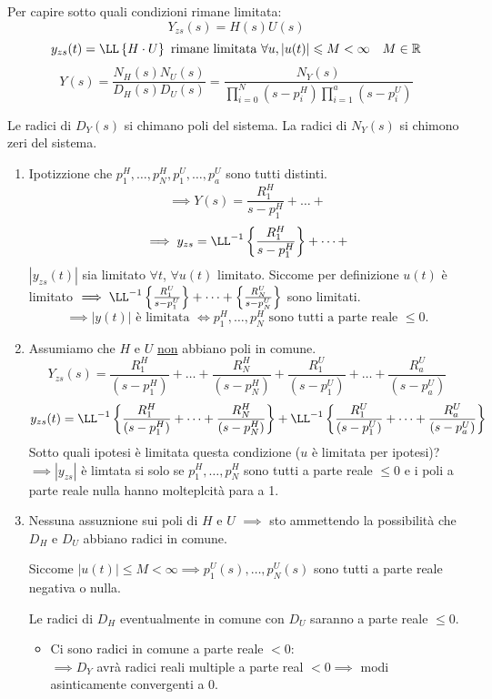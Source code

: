 \documentclass[12pt]{article}
\begin{document}
Per capire sotto quali condizioni rimane limitata:
\[ Y _{zs}(s) = H(s)U(s) \]
\[ y _{zs}(t) = \LL \left\{ H\cdot U \right\} \text{ rimane limitata } \forall u, |u(t)| \leqslant M < \infty \quad M \in \mathbb{R} \]
\[ Y(s)  = \frac{N_H(s)N_U(s)}{D_H(s)D_U(s)}  = \frac{N_Y(s)}{\prod_{i=0}^{N} (s-p_i^{H}) \prod_{i=1}^{a} (s-p_i^{U}) }  \]

Le radici di $D_Y(s)$ si chimano poli del sistema.
La radici di $N_Y(s)$ si chimono zeri del sistema.

\begin{enumerate}
    \item Ipotizzione che $p_1^{H},\dots,p_N^{H},p_1^{U},\dots,p_a^{U}$ sono tutti distinti.
        \[ \implies Y(s) = \frac{R_1^{H}}{s-p_1^{H}} + \dots +\]
        \[ \implies y _{zs} = \LL^{-1} \left\{ \frac{R_1^{H}}{s-p_1^{H}}  \right\} + \dots +   \]
        $ \left|  y _{zs}(t) \right| $ sia limitato $\forall t$, $\forall u(t)$ limitato. Siccome per definizione $u(t)$ \`e limitato $ \implies\LL^{-1} \left\{ \frac{R_1^{U}}{s-p_1^{U}}  \right\} + \dots + \left\{ \frac{R_N^{U}}{s-p_N^{U}}  \right\}$ sono limitati. 
        \[ \boxed{ \implies |y(t)| \text{ \`e limitata } \iff p_1^{H},\dots,p_N^{H} \text{ sono tutti a parte reale } \leqslant 0}.\] 
        \item Assumiamo che $H$ e $U$ \underline{non} abbiano poli in comune.
        \[ Y _{zs}(s) = \frac{R_1^{H}}{(s-p_1^{H})} +\dots+ \frac{R_N^{H}}{(s-p_N^{H})} + \frac{R_1^{U}}{(s-p_1^{U})} +\dots + \frac{R_a^{U}}{(s-p_a^{U})} \]
        \[ y _{zs}(t) = \LL^{-1} \left\{ \frac{R_1^{H}}{(s-p_1^{H})} +\dots+ \frac{R_N^{H}}{(s-p_N^{H})}   \right\} +\LL^{-1} \left\{ \frac{R_1^{U}}{(s-p_1^{U})} +\dots+ \frac{R_a^{U}}{(s-p_a^{U})}  \right\}  \]
        Sotto quali ipotesi \`e limitata questa condizione ($u$ \`e limitata per ipotesi)?
        $\implies |y _{zs}|$ \`e limtata si solo se $p_1^{H},\dots,p_N^{H}$ sono tutti a parte reale $ \leqslant 0$ e i poli a parte reale nulla hanno molteplcit\`a para a 1.

    \item Nessuna assuznione sui poli di $H$ e $U$ $ \implies$ sto ammettendo la possibilit\`a che $D_H$ e $D_U$ abbiano radici in comune.

        Siccome $ |u(t)| \leqslant M < \infty \implies p_1^{U}(s),\dots,p_N^{U}(s) $ sono tutti a parte reale negativa o nulla.

        Le radici di $D_H$ eventualmente in comune con $D_U$ saranno a parte reale $ \leqslant 0$. 
        \begin{itemize}
            \item Ci sono radici in comune a parte reale $ < 0$: \\
                $ \implies D_Y$ avr\`a radici reali multiple a parte real $< 0 \implies$ modi asinticamente convergenti a 0.


\end{itemize}
\end{enumerate}
\end{document}
